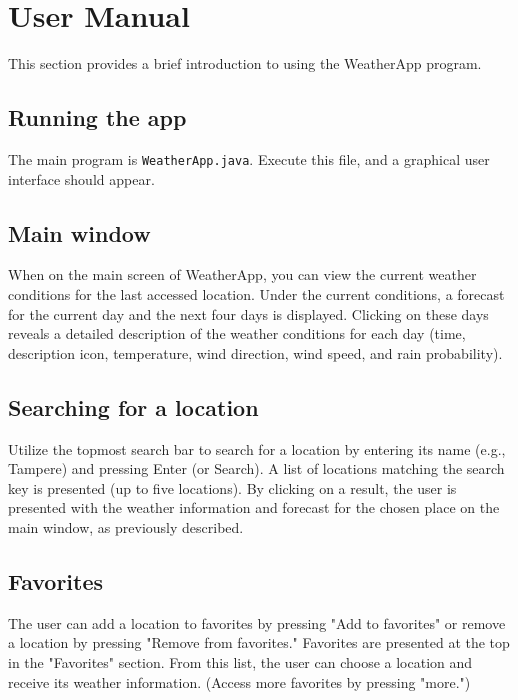\documentclass[a4paper,10pt]{article}
\begin{document}
\section{User Manual}

This section provides a brief introduction to using the WeatherApp program.

\subsection{Running the app}

The main program is \texttt{WeatherApp.java}. Execute this file, and a graphical user interface should appear.

\subsection{Main window}

When on the main screen of WeatherApp, you can view the current weather conditions for the last accessed location. Under the current conditions, a forecast for the current day and the next four days is displayed. Clicking on these days reveals a detailed description of the weather conditions for each day (time, description icon, temperature, wind direction, wind speed, and rain probability).

\subsection{Searching for a location}

Utilize the topmost search bar to search for a location by entering its name (e.g., Tampere) and pressing Enter (or Search). A list of locations matching the search key is presented (up to five locations). By clicking on a result, the user is presented with the weather information and forecast for the chosen place on the main window, as previously described.

\subsection{Favorites}

The user can add a location to favorites by pressing "Add to favorites" or remove a location by pressing "Remove from favorites." Favorites are presented at the top in the "Favorites" section. From this list, the user can choose a location and receive its weather information. (Access more favorites by pressing "more.")
\end{document}
